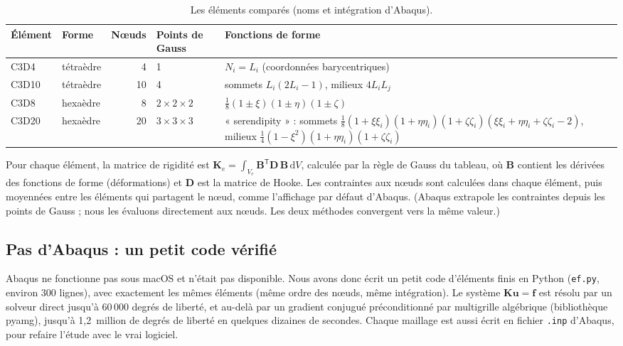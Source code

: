 \documentclass[11pt,a4paper]{article}
\newcommand{\fichier}[1]{\texttt{\small #1}}
\newcommand{\vb}[1]{\mathbf{#1}}
\begin{document}
\begin{table}[h]
\centering\small
\caption{Les éléments comparés (noms et intégration d'Abaqus).}
\label{tab-elements}
\begin{tabularx}{\textwidth}{llrlY}
\toprule
\textbf{Élément} & \textbf{Forme} & \textbf{Nœuds} & \textbf{Points de Gauss} & \textbf{Fonctions de forme} \\
\midrule
C3D4 & tétraèdre & 4 & 1 & $N_i = L_i$ (coordonnées barycentriques) \\
C3D10 & tétraèdre & 10 & 4 & sommets $L_i(2L_i - 1)$, milieux $4L_iL_j$ \\
C3D8 & hexaèdre & 8 & $2 \times 2 \times 2$ & $\tfrac18(1 \pm \xi)(1 \pm \eta)(1 \pm \zeta)$ \\
C3D20 & hexaèdre & 20 & $3 \times 3 \times 3$ & « serendipity » : sommets
$\tfrac18(1+\xi\xi_i)(1+\eta\eta_i)(1+\zeta\zeta_i)(\xi\xi_i+\eta\eta_i+\zeta\zeta_i-2)$, milieux
$\tfrac14(1-\xi^2)(1+\eta\eta_i)(1+\zeta\zeta_i)$ \\
\bottomrule
\end{tabularx}
\end{table}

Pour chaque élément, la matrice de rigidité est $\vb{K}_e = \int_{V_e} \vb{B}^{\mathsf T}\vb{D}\,\vb{B}\,\mathrm{d}V$,
calculée par la règle de Gauss du tableau, où $\vb{B}$ contient les dérivées des fonctions de forme (déformations) et
$\vb{D}$ est la matrice de Hooke. Les contraintes aux nœuds sont calculées dans chaque élément, puis moyennées entre
les éléments qui partagent le nœud, comme l'affichage par défaut d'Abaqus. (Abaqus extrapole les contraintes depuis
les points de Gauss ; nous les évaluons directement aux nœuds. Les deux méthodes convergent vers la même valeur.)

\subsection{Pas d'Abaqus : un petit code vérifié}

Abaqus ne fonctionne pas sous macOS et n'était pas disponible. Nous avons donc écrit un petit code d'éléments finis
en Python (\fichier{ef.py}, environ 300 lignes), avec exactement les mêmes éléments (même ordre des nœuds, même
intégration). Le système $\vb{K}\vb{u} = \vb{f}$ est résolu par un solveur direct jusqu'à 60\,000 degrés de liberté, et
au-delà par un gradient conjugué préconditionné par multigrille algébrique (bibliothèque pyamg), jusqu'à
1,2~million de degrés de liberté en quelques dizaines de secondes. Chaque maillage est aussi écrit en fichier
\fichier{.inp} d'Abaqus, pour refaire l'étude avec le vrai logiciel.
\end{document}
